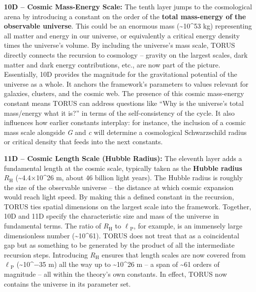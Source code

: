 \documentclass[]{article}
\newcommand{\subscript}[1]{\ensuremath{_{\mathrm{#1}}}}
\begin{document}
\textbf{10D -- Cosmic Mass-Energy Scale:} The tenth layer jumps to the
cosmological arena by introducing a constant on the order of the
\textbf{total mass-energy of the observable universe}. This could be an
enormous mass (\textasciitilde{}10\^{}53 kg) representing all matter and
energy in our universe, or equivalently a critical energy density times
the universe's volume. By including the universe's mass scale, TORUS
directly connects the recursion to cosmology -- gravity on the largest
scales, dark matter and dark energy contributions, etc., are now part of
the picture. Essentially, 10D provides the magnitude for the
gravitational potential of the universe as a whole. It anchors the
framework's parameters to values relevant for galaxies, clusters, and
the cosmic web. The presence of this cosmic mass-energy constant means
TORUS can address questions like ``Why is the universe's total
mass/energy what it is?'' in terms of the self-consistency of the cycle.
It also influences how earlier constants interplay: for instance, the
inclusion of a cosmic mass scale alongside \emph{G} and \emph{c} will
determine a cosmological Schwarzschild radius or critical density that
feeds into the next constants.

\textbf{11D -- Cosmic Length Scale (Hubble Radius):} The eleventh layer
adds a fundamental length at the cosmic scale, typically taken as the
\textbf{Hubble radius}
$R\subscript{H}$ (\textasciitilde{}4.4×10\^{}26 m, about 46 billion light years). The
Hubble radius is roughly the size of the observable universe -- the
distance at which cosmic expansion would reach light speed. By making
this a defined constant in the recursion, TORUS ties spatial dimensions
on the largest scale into the framework. Together, 10D and 11D specify
the characteristic size and mass of the universe in fundamental terms.
The ratio of
$R\subscript{H}$ to
$\ell\subscript{P}$, for example, is an immensely large dimensionless
number (\textasciitilde{}10\^{}61). TORUS does not treat that as a
coincidental gap but as something to be generated by the product of all
the intermediate recursion steps. Introducing
$R\subscript{H}$
ensures that length scales are now covered from
$\ell\subscript{P}$
(\textasciitilde{}10\^{}−35 m) all the way up to
\textasciitilde{}10\^{}26 m -- a span of \textasciitilde{}61 orders of
magnitude -- all within the theory's own constants. In effect, TORUS now
contains the universe in its parameter set.
\end{document}

